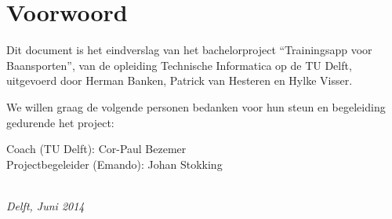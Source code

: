 \chapter*{Voorwoord}

Dit document is het eindverslag van het bachelorproject ``Trainingsapp voor Baansporten'', van de opleiding Technische Informatica op de TU Delft, uitgevoerd door Herman Banken, Patrick van Hesteren en Hylke Visser.

\bigskip

\noindent We willen graag de volgende personen bedanken voor hun steun en begeleiding gedurende het project:

\medskip

\noindent
Coach (TU Delft): Cor-Paul Bezemer\\
Projectbegeleider (Emando): Johan Stokking

\bigskip

\begin{flushright}
{\makeatletter\itshape
    \@author \\
    Delft, Juni 2014
\makeatother}
\end{flushright}